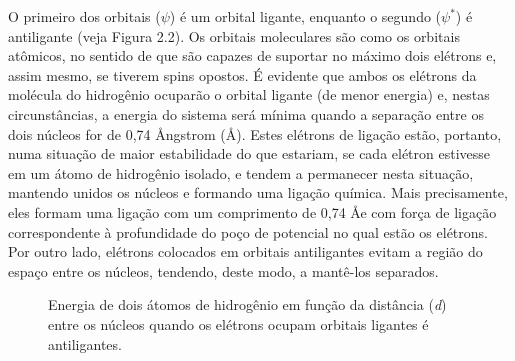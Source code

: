 O primeiro dos orbitais ($\psi$) é um orbital ligante, enquanto o segundo ($\psi ^*$) é antiligante (veja Figura 2.2). Os orbitais moleculares são como os orbitais atômicos, no sentido de que são capazes de suportar no máximo dois elétrons e, assim mesmo, se tiverem spins opostos. É evidente que ambos os elétrons da molécula do hidrogênio ocuparão o orbital ligante (de menor energia) e, nestas circunstâncias, a energia do sistema será mínima quando a separação entre os dois núcleos for de 0,74 \AA ngstrom (\AA). Estes elétrons de ligação estão, portanto, numa situação de maior estabilidade do que estariam, se cada elétron estivesse em um átomo de hidrogênio isolado, e tendem a permanecer nesta situação, mantendo unidos os núcleos e formando uma ligação química. Mais precisamente, eles formam uma ligação com um comprimento de 0,74 \AA \enspace e com força de ligação correspondente à profundidade do poço de potencial no qual estão os elétrons. Por outro lado, elétrons colocados em orbitais antiligantes evitam a região do espaço entre os núcleos, tendendo, deste modo, a mantê-los separados. 

\begin{figure}[H]
    \centering
    \caption{Energia de dois átomos de hidrogênio em função da distância (\textit{d}) entre os núcleos quando os elétrons ocupam orbitais ligantes é antiligantes.}
    \label{figura_2_2}
\end{figure}


